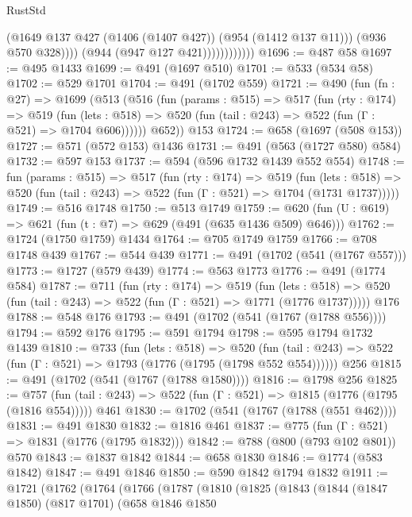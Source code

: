 \begin{lexlean}{RustStd}
\begin{coremodule}
                              (@1649 @137 @427 (@1406 (@1407 @427)) (@954 (@1412 @137 @11)))
                              (@936 @570 @328))))
                        (@944 (@947 @127 @421))))))))))))
@1696 := @487 @58
@1697 := @495 @1433
@1699 := @491 (@1697 @510)
@1701 := @533 (@534 @58)
@1702 := @529 @1701
@1704 := @491 (@1702 @559)
@1721 := @490
    (fun (fn : @27) =>
    @1699
      (@513
        (@516
          (fun (params : @515) =>
          @517
            (fun (rty : @174) =>
            @519
              (fun (lets : @518) =>
              @520 (fun (tail : @243) => @522 (fun (Γ : @521) => @1704 @606))))))
        @652))
    @153
@1724 := @658 (@1697 (@508 @153))
@1727 := @571 (@572 @153) @1436
@1731 := @491 (@563 (@1727 @580) @584)
@1732 := @597 @153
@1737 := @594 (@596 @1732 @1439 @552 @554)
@1748 := fun (params : @515) =>
  @517
    (fun (rty : @174) =>
    @519
      (fun (lets : @518) =>
      @520 (fun (tail : @243) => @522 (fun (Γ : @521) => @1704 (@1731 @1737)))))
@1749 := @516 @1748
@1750 := @513 @1749
@1759 := @620 (fun (U : @619) => @621 (fun (t : @7) => @629 (@491 (@635 @1436 @509) @646)))
@1762 := @1724 (@1750 @1759) @1434
@1764 := @705 @1749 @1759
@1766 := @708 @1748 @439
@1767 := @544 @439
@1771 := @491 (@1702 (@541 (@1767 @557)))
@1773 := @1727 (@579 @439)
@1774 := @563 @1773
@1776 := @491 (@1774 @584)
@1787 := @711
    (fun (rty : @174) =>
    @519
      (fun (lets : @518) =>
      @520 (fun (tail : @243) => @522 (fun (Γ : @521) => @1771 (@1776 @1737)))))
    @176
@1788 := @548 @176
@1793 := @491 (@1702 (@541 (@1767 (@1788 @556))))
@1794 := @592 @176
@1795 := @591 @1794
@1798 := @595 @1794 @1732 @1439
@1810 := @733
    (fun (lets : @518) =>
    @520 (fun (tail : @243) => @522 (fun (Γ : @521) => @1793 (@1776 (@1795 (@1798 @552 @554))))))
    @256
@1815 := @491 (@1702 (@541 (@1767 (@1788 @1580))))
@1816 := @1798 @256
@1825 := @757
    (fun (tail : @243) => @522 (fun (Γ : @521) => @1815 (@1776 (@1795 (@1816 @554)))))
    @461
@1830 := @1702 (@541 (@1767 (@1788 (@551 @462))))
@1831 := @491 @1830
@1832 := @1816 @461
@1837 := @775 (fun (Γ : @521) => @1831 (@1776 (@1795 @1832)))
@1842 := @788 (@800 (@793 @102 @801)) @570
@1843 := @1837 @1842
@1844 := @658 @1830
@1846 := @1774 (@583 @1842)
@1847 := @491 @1846
@1850 := @590 @1842 @1794 @1832
@1911 := @1721
    (@1762
      (@1764
        (@1766
          (@1787
            (@1810
              (@1825
                (@1843
                  (@1844
                    (@1847 @1850)
                    (@817 @1701)
                    (@658
                      @1846
                      @1850

\end{coremodule}
\end{lexlean}

